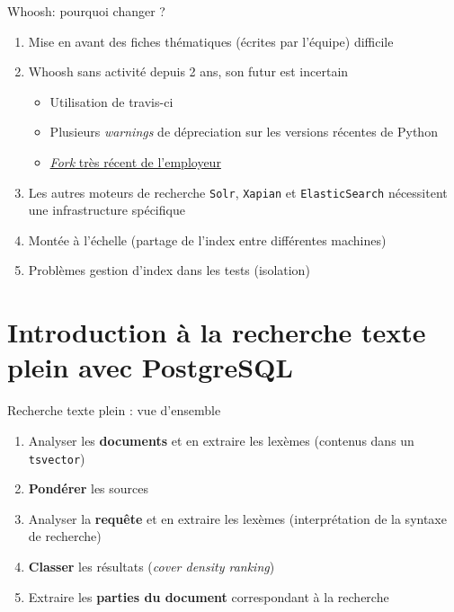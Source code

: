 \documentclass{beamer}
\begin{document}
\begin{frame}{Whoosh: pourquoi changer ?}
    \begin{enumerate}
        \item Mise en avant des fiches thématiques (écrites par l'équipe) difficile
        \pause
        \item Whoosh sans activité depuis 2 ans, son futur est incertain
            \begin{itemize}
                \pause
                \item Utilisation de travis-ci
                \pause
                \item Plusieurs \textit{warnings} de dépreciation sur les
                    versions récentes de Python
                \pause
                \item
                    \href{https://github.com/Sygil-Dev/whoosh-reloaded}{\textit{Fork}
                    très récent de l'employeur}
                \pause
            \end{itemize}
        \item Les autres moteurs de recherche \texttt{Solr},
            \texttt{Xapian} et \texttt{ElasticSearch} nécessitent une
            infrastructure spécifique
        \pause
        \item Montée à l'échelle (partage de l'index entre différentes machines)
        \pause
        \item Problèmes gestion d'index dans les tests (isolation)
    \end{enumerate}
\end{frame}

\section{Introduction à la recherche texte plein avec PostgreSQL} %

\begin{frame}{Recherche texte plein : vue d'ensemble}
    \begin{enumerate}
        \item Analyser les \textbf{documents} et en extraire les lexèmes\newline
            (contenus dans un \texttt{tsvector})
        \item \textbf{Pondérer} les sources
        \item Analyser la \textbf{requête} et en extraire les lexèmes\newline
            (interprétation de la syntaxe de recherche)
        \item \textbf{Classer} les résultats (\textit{cover density ranking})
        \item Extraire les \textbf{parties du document} correspondant à la recherche
    \end{enumerate}
\end{frame}
\end{document}
